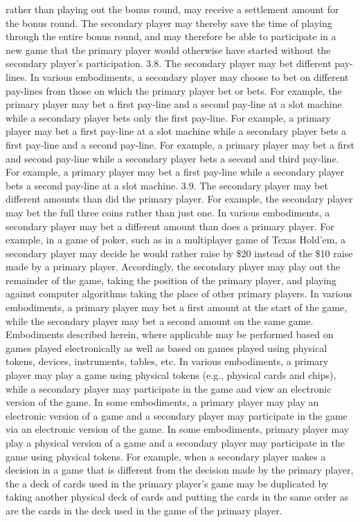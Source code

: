 \documentclass[11pt,a4paper]{article}
\begin{document}
rather than playing out the bonus round, may receive a settlement amount for the bonus round. The secondary player may thereby save the time of playing through the entire bonus round, and may therefore be able to participate in a new game that the primary player would otherwise have started without the secondary player's participation. 3.8. The secondary player may bet different pay-lines. In various embodiments, a secondary player may choose to bet on different pay-lines from those on which the primary player bet or bets. For example, the primary player may bet a first pay-line and a second pay-line at a slot machine while a secondary player bets only the first pay-line. For example, a primary player may bet a first pay-line at a slot machine while a secondary player bets a first pay-line and a second pay-line. For example, a primary player may bet a first and second pay-line while a secondary player bets a second and third pay-line. For example, a primary player may bet a first pay-line while a secondary player bets a second pay-line at a slot machine. 3.9. The secondary player may bet different amounts than did the primary player. For example, the secondary player may bet the full three coins rather than just one. In various embodiments, a secondary player may bet a different amount than does a primary player. For example, in a game of poker, such as in a multiplayer game of Texas Hold'em, a secondary player may decide he would rather raise by \$20 instead of the \$10 raise made by a primary player. Accordingly, the secondary player may play out the remainder of the game, taking the position of the primary player, and playing against computer algorithms taking the place of other primary players. In various embodiments, a primary player may bet a first amount at the start of the game, while the secondary player may bet a second amount on the same game. Embodiments described herein, where applicable may be performed based on games played electronically as well as based on games played using physical tokens, devices, instruments, tables, etc. In various embodiments, a primary player may play a game using physical tokens (e.g., physical cards and chips), while a secondary player may participate in the game and view an electronic version of the game. In some embodiments, a primary player may play an electronic version of a game and a secondary player may participate in the game via an electronic version of the game. In some embodiments, primary player may play a physical version of a game and a secondary player may participate in the game using physical tokens. For example, when a secondary player makes a decision in a game that is different from the decision made by the primary player, the a deck of cards used in the primary player's game may be duplicated by taking another physical deck of cards and putting the cards in the same order as are the cards in the deck used in the game of the primary player.
\end{document}
